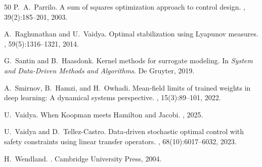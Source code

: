 \documentclass[11pt]{article}
\begin{document}
\begin{thebibliography}{50}
P.~A.~Parrilo.
\newblock A sum of squares optimization approach to control design.
, 39(2):185--201, 2003.

A.~Raghunathan and U.~Vaidya.
\newblock Optimal stabilization using {L}yapunov measures.
, 59(5):1316--1321, 2014.

G.~Santin and B.~Haasdonk.
\newblock Kernel methods for surrogate modeling.
\newblock In {\em System and Data-Driven Methods and Algorithms}. De Gruyter, 2019.

A.~Smirnov, B.~Hamzi, and H.~Owhadi.
\newblock Mean-field limits of trained weights in deep learning: A dynamical systems perspective.
, 15(3):89--101, 2022.

U.~Vaidya.
\newblock When {K}oopman meets {H}amilton and {J}acobi.
, 2025.

U.~Vaidya and D.~Tellez-Castro.
\newblock Data-driven stochastic optimal control with safety constraints using linear transfer operators.
, 68(10):6017--6032, 2023.

H.~Wendland.
.
\newblock Cambridge University Press, 2004.

\end{thebibliography}
\end{document}
